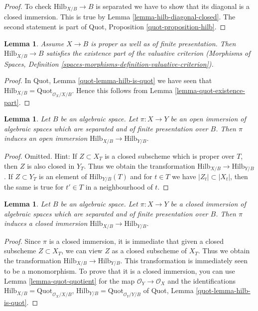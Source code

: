 \documentclass{stacks-project}
\theoremstyle{plain}
\newtheorem{lemma}[subsection]{Lemma}
\theoremstyle{definition}
\theoremstyle{remark}
\numberwithin{equation}{subsection}
\def\Quotfunctor{\mathrm{Quot}}
\def\Hilbfunctor{\mathrm{Hilb}}
\begin{document}
\begin{proof}
To check $\Hilbfunctor_{X/B} \to B$ is separated we have to
show that its diagonal is a closed immersion. This
is true by Lemma \ref{lemma-hilb-diagonal-closed}.
The second statement is part of
Quot, Proposition \ref{quot-proposition-hilb}.
\end{proof}

\begin{lemma}
\label{lemma-hilb-existence-part}
Assume $X \to B$ is proper as well as of finite presentation.
Then $\Hilbfunctor_{X/B} \to B$ satisfies the existence part
of the valuative criterion (Morphisms of Spaces, Definition
\ref{spaces-morphisms-definition-valuative-criterion}).
\end{lemma}

\begin{proof}
In Quot, Lemma \ref{quot-lemma-hilb-is-quot} we have seen that
$\Hilbfunctor_{X/B} = \Quotfunctor_{\mathcal{O}_X/X/B}$.
Hence this follows from Lemma \ref{lemma-quot-existence-part}.
\end{proof}

\begin{lemma}
\label{lemma-hilb-open}
Let $B$ be an algebraic space. Let $\pi : X \to Y$ be an open immersion
of algebraic spaces which are separated and of finite presentation over $B$.
Then $\pi$ induces an open immersion
$\Hilbfunctor_{X/B} \to \Hilbfunctor_{Y/B}$.
\end{lemma}

\begin{proof}
Omitted. Hint: If $Z \subset X_T$ is a closed subscheme which is
proper over $T$, then $Z$ is also closed in $Y_T$. Thus we obtain
the transformation $\Hilbfunctor_{X/B} \to \Hilbfunctor_{Y/B}$.
If $Z \subset Y_T$ is an element of $\Hilbfunctor_{Y/B}(T)$
and for $t \in T$ we have $|Z_t| \subset |X_t|$,
then the same is true for $t' \in T$ in a neighbourhood of $t$.
\end{proof}

\begin{lemma}
\label{lemma-hilb-closed}
Let $B$ be an algebraic space. Let $\pi : X \to Y$ be a closed immersion
of algebraic spaces which are separated and of finite presentation
over $B$. Then $\pi$ induces a closed immersion
$\Hilbfunctor_{X/B} \to \Hilbfunctor_{Y/B}$.
\end{lemma}

\begin{proof}
Since $\pi$ is a closed immersion, it is immediate that given a
closed subscheme $Z \subset X_T$,
we can view $Z$ as a closed subscheme of $X_T$. Thus we obtain
the transformation $\Hilbfunctor_{X/B} \to \Hilbfunctor_{Y/B}$.
This transformation is immediately seen to be a monomorphism.
To prove that it is a closed immersion, you can use
Lemma \ref{lemma-quot-quotient} for the map
$\mathcal{O}_Y \to \mathcal{O}_X$ and the identifications
$\Hilbfunctor_{X/B} = \Quotfunctor_{\mathcal{O}_X/X/B}$,
$\Hilbfunctor_{Y/B} = \Quotfunctor_{\mathcal{O}_Y/Y/B}$
of Quot, Lemma \ref{quot-lemma-hilb-is-quot}.
\end{proof}
\end{document}
